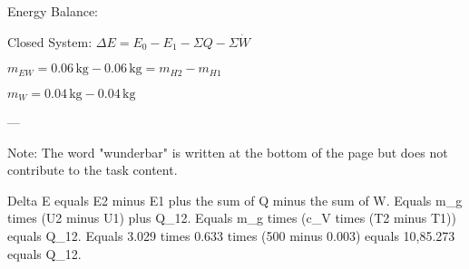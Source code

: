 Energy Balance:  

Closed System:  
\( \Delta E = E_0 - E_1 - \Sigma Q - \Sigma \dot{W} \)  

\( m_{EW} = 0.06 \, \text{kg} - 0.06 \, \text{kg} = m_{H2} - m_{H1} \)  

\( m_{W} = 0.04 \, \text{kg} - 0.04 \, \text{kg} \)  

---

Note: The word "wunderbar" is written at the bottom of the page but does not contribute to the task content.

Delta E equals E2 minus E1 plus the sum of Q minus the sum of W.  
Equals m_g times (U2 minus U1) plus Q_12.  
Equals m_g times (c_V times (T2 minus T1)) equals Q_12.  
Equals 3.029 times 0.633 times (500 minus 0.003) equals 10,85.273 equals Q_12.